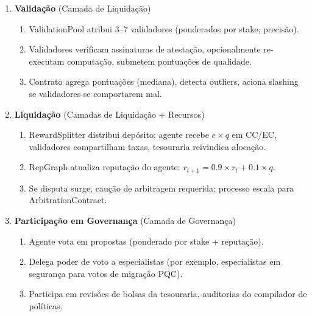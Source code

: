 \documentclass[11pt]{article}
\begin{document}
\begin{enumerate}
\begin{enumerate}[label=\alph*.]
      \item TEE gera relatório de atestação: hash de medição (prova integridade de código), hashes de entrada/saída, timestamps, uso de energia.
      \item Agente assina resultado e atestação, computa hash de conteúdo, submete via \texttt{submitWork()}.
    \end{enumerate}
  \item \textbf{Validação} (Camada de Liquidação)
    \begin{enumerate}[label=\alph*.]
      \item ValidationPool atribui 3--7 validadores (ponderados por stake, precisão).
      \item Validadores verificam assinaturas de atestação, opcionalmente re-executam computação, submetem pontuações de qualidade.
      \item Contrato agrega pontuações (mediana), detecta outliers, aciona slashing se validadores se comportarem mal.
    \end{enumerate}
  \item \textbf{Liquidação} (Camadas de Liquidação + Recursos)
    \begin{enumerate}[label=\alph*.]
      \item RewardSplitter distribui depósito: agente recebe $e \times q$ em CC/EC, validadores compartilham taxas, tesouraria reivindica alocação.
      \item RepGraph atualiza reputação do agente: $r_{t+1} = 0.9 \times r_t + 0.1 \times q$.
      \item Se disputa surge, caução de arbitragem requerida; processo escala para ArbitrationContract.
    \end{enumerate}
  \item \textbf{Participação em Governança} (Camada de Governança)
    \begin{enumerate}[label=\alph*.]
      \item Agente vota em propostas (ponderado por stake + reputação).
      \item Delega poder de voto a especialistas (por exemplo, especialistas em segurança para votos de migração PQC).
      \item Participa em revisões de bolsas da tesouraria, auditorias do compilador de políticas.
    \end{enumerate}
\end{enumerate}
\end{document}
